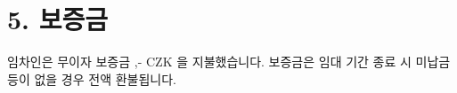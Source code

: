 \section*{5. 보증금}
임차인은 무이자 보증금 \DepositAmount,- CZK 을 지불했습니다. 보증금은 임대 기간 종료 시 미납금 등이 없을 경우 전액 환불됩니다.
